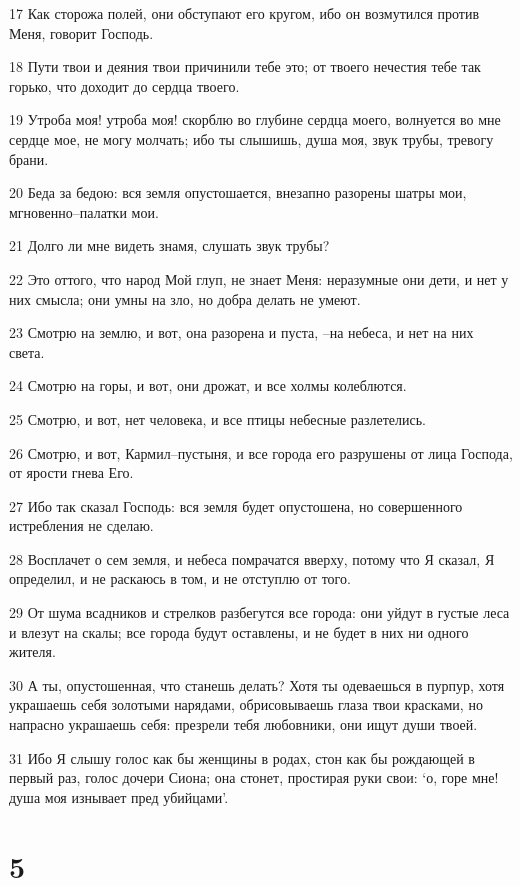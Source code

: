 \par 17 Как сторожа полей, они обступают его кругом, ибо он возмутился против Меня, говорит Господь.
\par 18 Пути твои и деяния твои причинили тебе это; от твоего нечестия тебе так горько, что доходит до сердца твоего.
\par 19 Утроба моя! утроба моя! скорблю во глубине сердца моего, волнуется во мне сердце мое, не могу молчать; ибо ты слышишь, душа моя, звук трубы, тревогу брани.
\par 20 Беда за бедою: вся земля опустошается, внезапно разорены шатры мои, мгновенно--палатки мои.
\par 21 Долго ли мне видеть знамя, слушать звук трубы?
\par 22 Это оттого, что народ Мой глуп, не знает Меня: неразумные они дети, и нет у них смысла; они умны на зло, но добра делать не умеют.
\par 23 Смотрю на землю, и вот, она разорена и пуста, --на небеса, и нет на них света.
\par 24 Смотрю на горы, и вот, они дрожат, и все холмы колеблются.
\par 25 Смотрю, и вот, нет человека, и все птицы небесные разлетелись.
\par 26 Смотрю, и вот, Кармил--пустыня, и все города его разрушены от лица Господа, от ярости гнева Его.
\par 27 Ибо так сказал Господь: вся земля будет опустошена, но совершенного истребления не сделаю.
\par 28 Восплачет о сем земля, и небеса помрачатся вверху, потому что Я сказал, Я определил, и не раскаюсь в том, и не отступлю от того.
\par 29 От шума всадников и стрелков разбегутся все города: они уйдут в густые леса и влезут на скалы; все города будут оставлены, и не будет в них ни одного жителя.
\par 30 А ты, опустошенная, что станешь делать? Хотя ты одеваешься в пурпур, хотя украшаешь себя золотыми нарядами, обрисовываешь глаза твои красками, но напрасно украшаешь себя: презрели тебя любовники, они ищут души твоей.
\par 31 Ибо Я слышу голос как бы женщины в родах, стон как бы рождающей в первый раз, голос дочери Сиона; она стонет, простирая руки свои: `о, горе мне! душа моя изнывает пред убийцами'.

\chapter{5}

